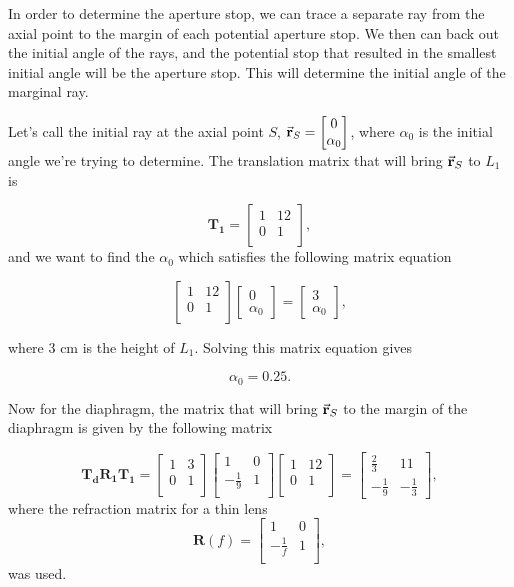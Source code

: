 \documentclass[a4paper]{article}
\begin{document}
In order to determine the aperture stop, we can trace a separate ray from the axial point to the margin of each potential aperture stop. We then can back out the initial angle of the rays, and the potential stop that resulted in the smallest initial angle will be the aperture stop. This will determine the initial angle of the marginal ray.

Let's call the initial ray at the axial point $S$, $\va{r}_S = \begin{bmatrix}
    0 \\
    \alpha_0
\end{bmatrix} $, where $\alpha_0$ is the initial angle we're trying to determine. The translation matrix that will bring $\va{r}_S$ to $L_1$ is

$$ \bm{T_1} = \begin{bmatrix}
    1 & 12 \\
    0 & 1 \\
\end{bmatrix}, $$
and we want to find the $\alpha_0$ which satisfies the following matrix equation

$$ \begin{bmatrix}
    1 & 12 \\
    0 & 1 \\
\end{bmatrix}
\begin{bmatrix}
    0 \\
    \alpha_0
\end{bmatrix} =
\begin{bmatrix}
    3 \\
    \alpha_0
\end{bmatrix}, $$

where 3 cm is the height of $L_1$. Solving this matrix equation gives

$$ \alpha_0 = 0.25. $$

Now for the diaphragm, the matrix that will bring $\va{r}_S$ to the margin of the diaphragm is given by the following matrix

$$ \bm{T_d}\bm{R_1}\bm{T_1} = \begin{bmatrix}
    1 & 3 \\
    0 & 1 \\
\end{bmatrix}
\begin{bmatrix}
    1 & 0 \\
    -\frac{1}{9} & 1 \\
\end{bmatrix}
\begin{bmatrix}
    1 & 12 \\
    0 & 1 \\
\end{bmatrix} = 
\begin{bmatrix}
    \frac{2}{3} & 11\\
    - \frac{1}{9} & - \frac{1}{3}
\end{bmatrix},$$
where the refraction matrix for a thin lens 
$$\bm{R}(f) = 
\begin{bmatrix}
    1 & 0 \\
    -\frac{1}{f} & 1 \\
\end{bmatrix},
$$
was used.
\end{document}
